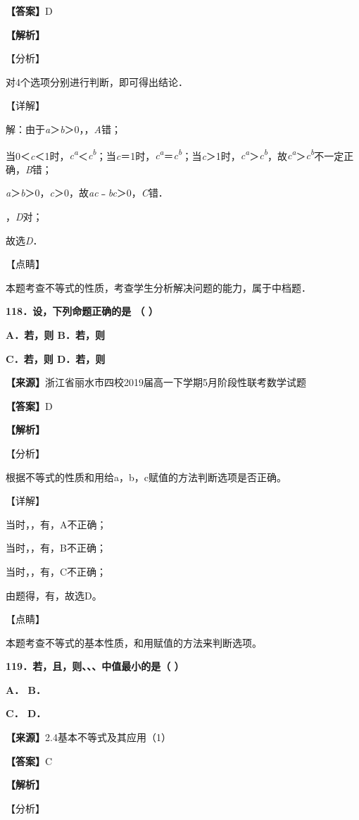\textbf{【答案】}D

\textbf{【解析】}

【分析】

对4个选项分别进行判断，即可得出结论．

【详解】

解：由于\emph{a}＞\emph{b}＞0，，\emph{A}错；

当0＜\emph{c}＜1时，\emph{c\textsuperscript{a}}＜\emph{c\textsuperscript{b}}；当\emph{c}＝1时，\emph{c\textsuperscript{a}}＝\emph{c\textsuperscript{b}}；当\emph{c}＞1时，\emph{c\textsuperscript{a}}＞\emph{c\textsuperscript{b}}，故\emph{c\textsuperscript{a}}＞\emph{c\textsuperscript{b}}不一定正确，\emph{B}错；

\emph{a}＞\emph{b}＞0，\emph{c}＞0，故\emph{ac}﹣\emph{bc}＞0，\emph{C}错．

，\emph{D}对；

故选\emph{D}．

【点睛】

本题考查不等式的性质，考查学生分析解决问题的能力，属于中档题．

\textbf{118．设，下列命题正确的是 （ ）}

\textbf{A．若，则 B．若，则}

\textbf{C．若，则 D．若，则}

\textbf{【来源】}浙江省丽水市四校2019届高一下学期5月阶段性联考数学试题

\textbf{【答案】}D

\textbf{【解析】}

【分析】

根据不等式的性质和用给a，b，c赋值的方法判断选项是否正确。

【详解】

当时，，有，A不正确；

当时，，有，B不正确；

当时，，有，C不正确；

由题得，有，故选D。

【点睛】

本题考查不等式的基本性质，和用赋值的方法来判断选项。

\textbf{119．若，且，则、、、中值最小的是（ ）}

\textbf{A． B．}

\textbf{C． D．}

\textbf{【来源】}2.4基本不等式及其应用（1）

\textbf{【答案】}C

\textbf{【解析】}

【分析】

